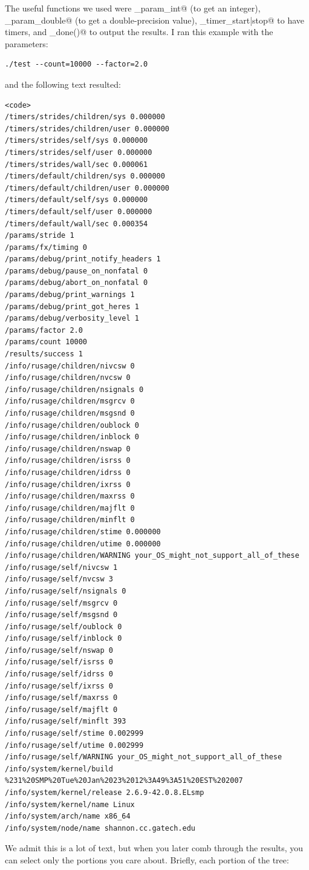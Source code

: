\documentclass[letter]{report}
\begin{document}
The useful functions we used were \verb@fx_param_int@ (to get an integer), \verb@fx_param_double@ (to get a double-precision value), \verb@fx_timer_{start|stop}@ to have timers, and \verb@fx_done()@ to output the results. I ran this example with the parameters:
\begin{verbatim}
./test --count=10000 --factor=2.0
\end{verbatim}
and the following text resulted:
\begin{verbatim}
<code>
/timers/strides/children/sys 0.000000
/timers/strides/children/user 0.000000
/timers/strides/self/sys 0.000000
/timers/strides/self/user 0.000000
/timers/strides/wall/sec 0.000061
/timers/default/children/sys 0.000000
/timers/default/children/user 0.000000
/timers/default/self/sys 0.000000
/timers/default/self/user 0.000000
/timers/default/wall/sec 0.000354
/params/stride 1
/params/fx/timing 0
/params/debug/print_notify_headers 1
/params/debug/pause_on_nonfatal 0
/params/debug/abort_on_nonfatal 0
/params/debug/print_warnings 1
/params/debug/print_got_heres 1
/params/debug/verbosity_level 1
/params/factor 2.0
/params/count 10000
/results/success 1
/info/rusage/children/nivcsw 0
/info/rusage/children/nvcsw 0
/info/rusage/children/nsignals 0
/info/rusage/children/msgrcv 0
/info/rusage/children/msgsnd 0
/info/rusage/children/oublock 0
/info/rusage/children/inblock 0
/info/rusage/children/nswap 0
/info/rusage/children/isrss 0
/info/rusage/children/idrss 0
/info/rusage/children/ixrss 0
/info/rusage/children/maxrss 0
/info/rusage/children/majflt 0
/info/rusage/children/minflt 0
/info/rusage/children/stime 0.000000
/info/rusage/children/utime 0.000000
/info/rusage/children/WARNING your_OS_might_not_support_all_of_these
/info/rusage/self/nivcsw 1
/info/rusage/self/nvcsw 3
/info/rusage/self/nsignals 0
/info/rusage/self/msgrcv 0
/info/rusage/self/msgsnd 0
/info/rusage/self/oublock 0
/info/rusage/self/inblock 0
/info/rusage/self/nswap 0
/info/rusage/self/isrss 0
/info/rusage/self/idrss 0
/info/rusage/self/ixrss 0
/info/rusage/self/maxrss 0
/info/rusage/self/majflt 0
/info/rusage/self/minflt 393
/info/rusage/self/stime 0.002999
/info/rusage/self/utime 0.002999
/info/rusage/self/WARNING your_OS_might_not_support_all_of_these
/info/system/kernel/build %231%20SMP%20Tue%20Jan%2023%2012%3A49%3A51%20EST%202007
/info/system/kernel/release 2.6.9-42.0.8.ELsmp
/info/system/kernel/name Linux
/info/system/arch/name x86_64
/info/system/node/name shannon.cc.gatech.edu
\end{verbatim}
We admit this is a lot of text, but when you later comb through the results, you can select only the portions you care about. Briefly, each portion of the tree:
\end{document}

